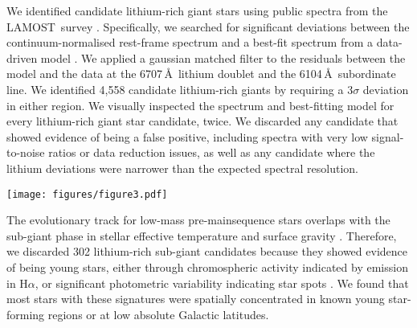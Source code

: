 \documentclass[twocolumn]{aastex62}
\newcommand\lamost{LAMOST}
\begin{document}
We identified candidate lithium-rich giant stars using public spectra from 
the \lamost\ survey \citep[Data Release 2;][]{Luo_2015}. Specifically, we searched for significant
deviations between the continuum-normalised rest-frame spectrum 
and a best-fit spectrum from a data-driven model \citep[Figure~\ref{fig:spectrum};][]{Ho_2017a,Ho_2017b}. We applied a gaussian matched filter to the 
residuals between the model and the data at the 6707\,\AA\ lithium doublet 
and the 6104\,\AA\ subordinate line.  We identified 4,558 candidate 
lithium-rich giants by requiring a $3\sigma$ deviation in either region. 
We visually inspected the spectrum and best-fitting model for every 
lithium-rich giant star candidate, twice. We discarded any candidate that 
showed evidence of being a false positive, including spectra with very low
signal-to-noise ratios or data reduction issues, as well as any candidate where the lithium 
deviations were narrower than the expected spectral resolution.

\begin{figure*}
    \texttt{[image: figures/figure3.pdf]}
        \caption{A portion of the \lamost\ spectrum and best-fitting model for an example lithium-rich giant star, J055640.1+144534.
        The data are shown in black and $1\sigma$ flux uncertainties are shaded in grey. A data-driven model of a lithium-normal star is shown in red, where the quadrature sum of model and data uncertainties are shaded in red. We mark the regions surrounding the 6104\,\AA\ and 6707\,\AA\ lithium transitions where we searched for significant residuals.}
    \label{fig:spectrum}
\end{figure*} 



The evolutionary track for low-mass pre-mainsequence stars overlaps with
the sub-giant phase in stellar effective temperature and surface 
gravity \citep{Dotter_2016,Choi_2016}. Therefore, we discarded 302 
lithium-rich sub-giant candidates because they showed evidence of being 
young stars, either through chromospheric activity indicated by emission 
in H$\alpha$, or significant photometric variability indicating star 
spots \citep{McQuillan_2014}. We found that most stars with these signatures were
spatially concentrated in known young star-forming regions or at low 
absolute Galactic latitudes. 

\end{document}
